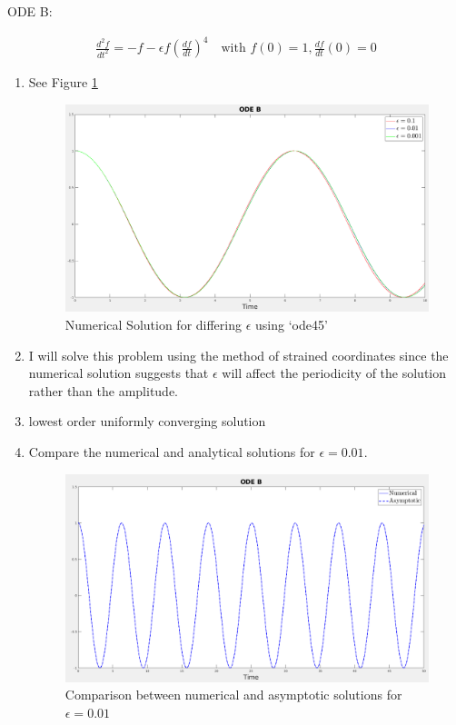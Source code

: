 \documentclass{article}
\begin{document}
\begin{enumerate}[label=\alph*.]
\end{enumerate}

\vspace{20pt}

ODE B: 

\begin{gather*}
    \frac{d^2f}{dt^2} = -f - \epsilon f \left(\frac{df}{dt}\right)^4 \quad
    \text{with } f(0) = 1, \frac{df}{dt}(0) = 0
\end{gather*}

\begin{enumerate}[label=\alph*.]
    \item See Figure \ref{fig:ODEB_num_sol}
        \begin{figure}[ht]
            \centering
            \includegraphics[width=\textwidth]{images/ODEB.png}
            \caption{Numerical Solution for differing $\epsilon$ using `ode45'}
            \label{fig:ODEB_num_sol}
        \end{figure}
    \item I will solve this problem using the method of strained coordinates
    since the numerical solution suggests that $\epsilon$ will affect the
    periodicity of the solution rather than the amplitude. 
    \item lowest order uniformly converging solution
    \item Compare the numerical and analytical solutions for $\epsilon = 0.01$. 
        \begin{figure}
            \centering
            \includegraphics[width=\textwidth]{images/ODEB_sol.png}
            \caption*{Comparison between numerical and asymptotic solutions for
            $\epsilon = 0.01$}
        \end{figure}


\end{enumerate}
\end{document}
